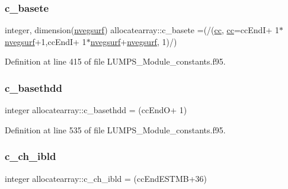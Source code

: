\mbox{\label{namespaceallocatearray_afd2a7a91940e16c0cb922eb9bfd9469e}} 
\subsubsection{\texorpdfstring{c\+\_\+basete}{c\_basete}}
{\footnotesize\ttfamily integer, dimension(\hyperlink{namespaceallocatearray_abb987c3b35dd321963fd53d38f10236f}{nvegsurf}) allocatearray\+::c\+\_\+basete =(/(\hyperlink{namespaceallocatearray_ac863c81704eb507dee10f5e10741e10c}{cc}, \hyperlink{namespaceallocatearray_ac863c81704eb507dee10f5e10741e10c}{cc}=cc\+EndI+ 1$\ast$\hyperlink{namespaceallocatearray_abb987c3b35dd321963fd53d38f10236f}{nvegsurf}+1,cc\+EndI+ 1$\ast$\hyperlink{namespaceallocatearray_abb987c3b35dd321963fd53d38f10236f}{nvegsurf}+\hyperlink{namespaceallocatearray_abb987c3b35dd321963fd53d38f10236f}{nvegsurf}, 1)/)}



Definition at line 415 of file L\+U\+M\+P\+S\+\_\+\+Module\+\_\+constants.\+f95.

\mbox{\label{namespaceallocatearray_aa77a8cbacfed015c662b9225f95325cf}} 
\subsubsection{\texorpdfstring{c\+\_\+basethdd}{c\_basethdd}}
{\footnotesize\ttfamily integer allocatearray\+::c\+\_\+basethdd = (cc\+EndO+ 1)}



Definition at line 535 of file L\+U\+M\+P\+S\+\_\+\+Module\+\_\+constants.\+f95.

\mbox{\label{namespaceallocatearray_ad5777b07403358943c3689a37f74bda7}} 
\subsubsection{\texorpdfstring{c\+\_\+ch\+\_\+ibld}{c\_ch\_ibld}}
{\footnotesize\ttfamily integer allocatearray\+::c\+\_\+ch\+\_\+ibld = (cc\+End\+E\+S\+T\+MB+36)}



